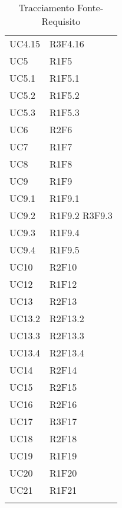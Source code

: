\begin{longtable} {
		>{\centering}p{28mm}  
		>{}p{20mm}
		}
		UC4.15 & R3F4.16 \TBstrut \\ [2mm]
		UC5 & R1F5 \TBstrut \\ [2mm]
		UC5.1 & R1F5.1 \TBstrut \\ [2mm]
		UC5.2 & R1F5.2 \TBstrut \\ [2mm]
		UC5.3 & R1F5.3 \TBstrut \\ [2mm]
		UC6 & R2F6 \TBstrut \\ [2mm]
		UC7 & R1F7 \TBstrut \\ [2mm]
		UC8 & R1F8 \TBstrut \\ [2mm]
		UC9 & R1F9 \TBstrut \\ [2mm]
		UC9.1 & R1F9.1 \TBstrut \\ [2mm]
		UC9.2 & R1F9.2 R3F9.3 \TBstrut \\ [2mm]
		UC9.3 & R1F9.4 \TBstrut \\ [2mm]
		UC9.4 & R1F9.5 \TBstrut \\ [2mm]
		UC10 & R2F10 \TBstrut \\ [2mm]
		UC12 & R1F12 \TBstrut \\ [2mm]
		UC13 & R2F13 \TBstrut \\ [2mm]
		UC13.2 & R2F13.2 \TBstrut \\ [2mm]
		UC13.3 & R2F13.3 \TBstrut \\ [2mm]
		UC13.4 & R2F13.4 \TBstrut \\ [2mm]
		UC14 & R2F14 \TBstrut \\ [2mm]
		UC15 & R2F15 \TBstrut \\ [2mm]
		UC16 & R2F16 \TBstrut \\ [2mm]
		UC17 & R3F17 \TBstrut \\ [2mm]
		UC18 & R2F18 \TBstrut \\ [2mm]
		UC19 & R1F19 \TBstrut \\ [2mm]
		UC20 & R1F20 \TBstrut \\ [2mm]
		UC21 & R1F21 \TBstrut \\ [2mm]
		\rowcolor{white}
		\caption{Tracciamento Fonte-Requisito}
	\end{longtable}


